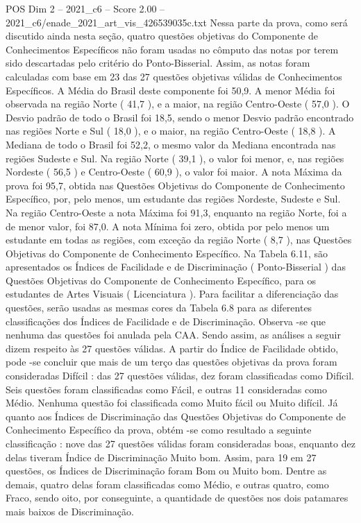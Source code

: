 \begin{textsample}{POS Dim 2 – 2021\_c6 – Score 2.00 – 2021\_c6/enade\_2021\_art\_vis\_426539035c.txt}
Nessa parte da prova, como será discutido ainda nesta seção, quatro questões objetivas do Componente de Conhecimentos Específicos não foram usadas no cômputo das notas por terem sido descartadas pelo critério do Ponto-Bisserial.
Assim, as notas foram calculadas com base em 23 das 27 questões objetivas válidas de Conhecimentos Específicos.
A Média do Brasil deste componente foi 50,9.
A menor Média foi observada na região Norte ( 41,7 ), e a maior, na região Centro-Oeste ( 57,0 ).
O Desvio padrão de todo o Brasil foi 18,5, sendo o menor Desvio padrão encontrado nas regiões Norte e Sul ( 18,0 ), e o maior, na região Centro-Oeste ( 18,8 ).
A Mediana de todo o Brasil foi 52,2, o mesmo valor da Mediana encontrada nas regiões Sudeste e Sul.
Na região Norte ( 39,1 ), o valor foi menor, e, nas regiões Nordeste ( 56,5 ) e Centro-Oeste ( 60,9 ), o valor foi maior.
A nota Máxima da prova foi 95,7, obtida nas Questões Objetivas do Componente de Conhecimento Específico, por, pelo menos, um estudante das regiões Nordeste, Sudeste e Sul.
Na região Centro-Oeste a nota Máxima foi 91,3, enquanto na região Norte, foi a de menor valor, foi 87,0.
A nota Mínima foi zero, obtida por pelo menos um estudante em todas as regiões, com exceção da região Norte ( 8,7 ), nas Questões Objetivas do Componente de Conhecimento Específico.
Na Tabela 6.11, são apresentados os Índices de Facilidade e de Discriminação ( Ponto-Bisserial ) das Questões Objetivas do Componente de Conhecimento Específico, para os estudantes de Artes Visuais ( Licenciatura ).
Para facilitar a diferenciação das questões, serão usadas as mesmas cores da Tabela 6.8 para as diferentes classificações dos Índices de Facilidade e de Discriminação.
Observa -se que nenhuma das questões foi anulada pela CAA.
Sendo assim, as análises a seguir dizem respeito às 27 questões válidas.
A partir do Índice de Facilidade obtido, pode -se concluir que mais de um terço das questões objetivas da prova foram consideradas Difícil : das 27 questões válidas, dez foram classificadas como Difícil.
Seis questões foram classificadas como Fácil, e outras 11 consideradas como Médio.
Nenhuma questão foi classificada como Muito fácil ou Muito difícil.
Já quanto aos Índices de Discriminação das Questões Objetivas do Componente de Conhecimento Específico da prova, obtém -se como resultado a seguinte classificação : nove das 27 questões válidas foram consideradas boas, enquanto dez delas tiveram Índice de Discriminação Muito bom.
Assim, para 19 em 27 questões, os Índices de Discriminação foram Bom ou Muito bom.
Dentre as demais, quatro delas foram classificadas como Médio, e outras quatro, como Fraco, sendo oito, por conseguinte, a quantidade de questões nos dois patamares mais baixos de Discriminação.

\end{textsample}
